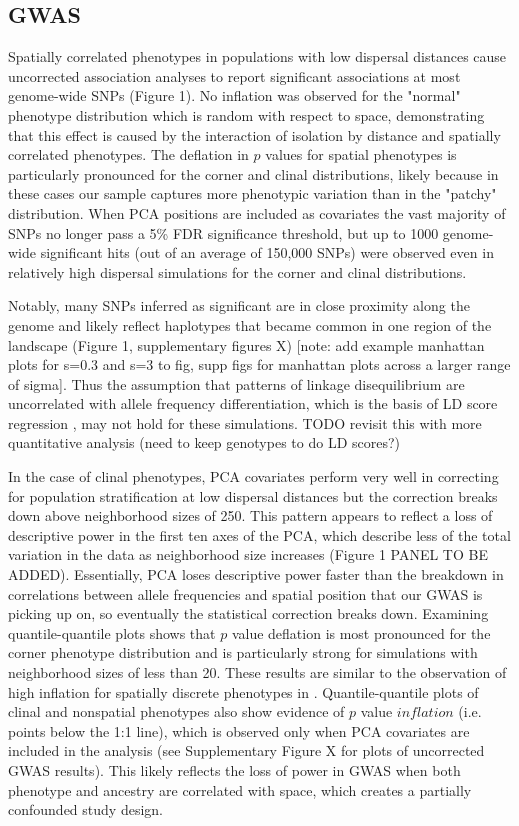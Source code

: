 \documentclass[9pt,twocolumn,twoside,lineno]{gsajnl}
\begin{document}
\subsection{GWAS}
Spatially correlated phenotypes in populations with low dispersal distances cause uncorrected association analyses to report significant associations at most genome-wide SNPs (Figure 1). No inflation was observed for the "normal" phenotype distribution which is random with respect to space, demonstrating that this effect is caused by the interaction of isolation by distance and spatially correlated phenotypes. The deflation in $p$ values for spatial phenotypes is particularly pronounced for the corner and clinal distributions, likely because in these cases our sample captures more phenotypic variation than in the "patchy" distribution. When PCA positions are included as covariates the vast majority of SNPs no longer pass a 5\% FDR significance threshold, but up to 1000 genome-wide significant hits (out of an average of 150,000 SNPs) were observed even in relatively high dispersal simulations for the corner and clinal distributions. 

Notably, many SNPs inferred as significant are in close proximity along the genome and likely reflect haplotypes that became common in one region of the landscape (Figure 1, supplementary figures X) [note: add example manhattan plots for s=0.3 and s=3 to fig, supp figs for manhattan plots across a larger range of sigma]. Thus the assumption that patterns of linkage disequilibrium are uncorrelated with allele frequency differentiation, which is the basis of LD score regression \citep{Bulik-Sullivan2015}, may not hold for these simulations. TODO revisit this with more quantitative analysis (need to keep genotypes to do LD scores?) 

In the case of clinal phenotypes, PCA covariates perform very well in correcting for population stratification at low dispersal distances but the correction breaks down above neighborhood sizes of 250. This pattern appears to reflect a loss of descriptive power in the first ten axes of the PCA, which describe less of the total variation in the data as neighborhood size increases (Figure 1 PANEL TO BE ADDED). Essentially, PCA loses descriptive power faster than the breakdown in correlations between allele frequencies and spatial position that our GWAS is picking up on, so eventually the statistical correction breaks down. 
Examining quantile-quantile plots shows that $p$ value deflation is most pronounced for the corner phenotype distribution and is particularly strong for simulations with neighborhood sizes of less than 20. These results are similar to the observation of high inflation for spatially discrete phenotypes in \citep{Mathieson2012}. Quantile-quantile plots of clinal and nonspatial phenotypes also show evidence of $p$ value $inflation$ (i.e. points below the 1:1 line), which is observed only when PCA covariates are included in the analysis (see Supplementary Figure X for plots of uncorrected GWAS results). This likely reflects the loss of power in GWAS when both phenotype and ancestry are correlated with space, which creates a partially confounded study design. 
\end{document}
